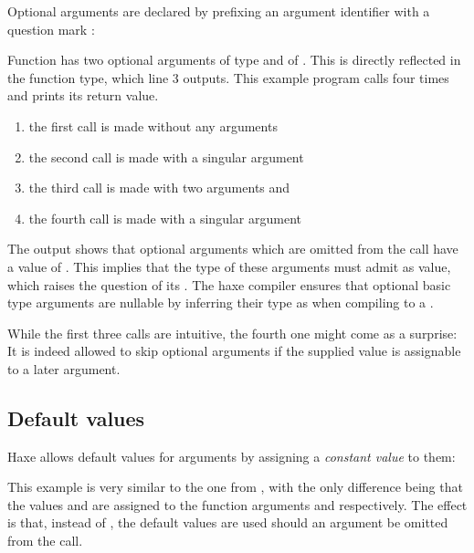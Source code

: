 \documentclass{haxe}
\begin{document}
Optional arguments are declared by prefixing an argument identifier with a question mark :

Function  has two optional arguments  of type  and  of . This is directly reflected in the function type, which line 3 outputs. 
This example program calls  four times and prints its return value.

\begin{enumerate}
	\item the first call is made without any arguments
	\item the second call is made with a singular argument 
	\item the third call is made with two arguments  and 
	\item the fourth call is made with a singular argument 
\end{enumerate}
The output shows that optional arguments which are omitted from the call have a value of . This implies that the type of these arguments must admit  as value, which raises the question of its . The haxe compiler ensures that optional basic type arguments are nullable by inferring their type as  when compiling to a .

While the first three calls are intuitive, the fourth one might come as a surprise: It is indeed allowed to skip optional arguments if the supplied value is assignable to a later argument.


\subsection{Default values}
\label{types-function-default-values}

Haxe allows default values for arguments by assigning a \emph{constant value} to them:

This example is very similar to the one from , with the only difference being that the values  and  are assigned to the function arguments  and  respectively. The effect is that, instead of , the default values are used should an argument be omitted from the call.

\end{document}
